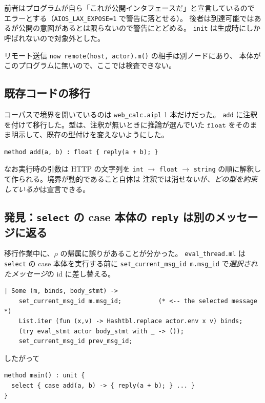 \documentclass[11pt,a4paper]{ltjsarticle}
\theoremstyle{definition}
\theoremstyle{remark}
\newcommand{\ty}[1]{\ensuremath{\mathtt{#1}}}
\begin{document}
前者はプログラムが自ら「これが公開インタフェースだ」と宣言しているので
エラーとする（\texttt{AIOS\_LAX\_EXPOSE=1} で警告に落とせる）。
後者は到達可能ではあるが公開の意図があるとは限らないので警告にとどめる。
\texttt{init} は生成時にしか呼ばれないので対象外とした。

リモート送信 \texttt{now remote(host, actor).m()} の相手は別ノードにあり、
本体がこのプログラムに無いので、ここでは検査できない。

\subsection{既存コードの移行}

コーパスで境界を開いているのは \texttt{web\_calc.aipl} 1 本だけだった。
\texttt{add} に注釈を付けて移行した。型は、注釈が無いときに推論が選んでいた
\ty{float} をそのまま明示して、既存の型付けを変えないようにした。

\begin{lstlisting}[language=AIPL]
method add(a, b) : float { reply(a + b); }
\end{lstlisting}

なお実行時の引数は HTTP の文字列を \texttt{int} $\to$ \texttt{float} $\to$
\texttt{string} の順に解釈して作られる。境界が動的であること自体は
注釈では消せないが、\emph{どの型を約束しているか}は宣言できる。

\subsection{発見：\texttt{select} の case 本体の \texttt{reply} は別のメッセージに返る}
\label{sec:select}

移行作業中に、$\rho$ の帰属に誤りがあることが分かった。
\texttt{eval\_thread.ml} は \texttt{select} の case 本体を実行する前に
\texttt{set\_current\_msg\_id m.msg\_id} で\emph{選択されたメッセージ}の
id に差し替える。

\begin{lstlisting}
| Some (m, binds, body_stmt) ->
    set_current_msg_id m.msg_id;          (* <-- the selected message *)
    List.iter (fun (x,v) -> Hashtbl.replace actor.env x v) binds;
    (try eval_stmt actor body_stmt with _ -> ());
    set_current_msg_id prev_msg_id;
\end{lstlisting}

したがって

\begin{lstlisting}[language=AIPL]
method main() : unit {
  select { case add(a, b) -> { reply(a + b); } ... }
}
\end{lstlisting}
\end{document}
